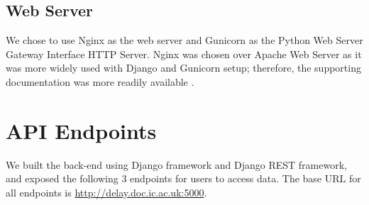 \subsection{Web Server}
\label{sec:gunicorn}
We chose to use Nginx\cite{nginx} as the web server and Gunicorn\cite{gunicorn} as the Python Web Server Gateway Interface HTTP Server. Nginx was chosen over Apache Web Server as it was more widely used with Django and Gunicorn setup; therefore, the supporting documentation was more readily available \cite{nginx_gunicorn_django}.

\section{API Endpoints}
\par We built the back-end using Django framework and Django REST framework, and exposed the following 3 endpoints for users to access data. The base URL for all endpoints is \url{http://delay.doc.ic.ac.uk:5000}.
